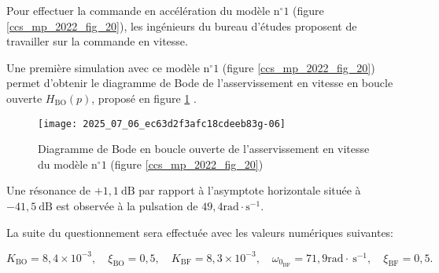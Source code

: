 Pour effectuer la commande en accélération du modèle $\mathrm{n}^{\circ} 1$ (figure \ref{ccs_mp_2022_fig_20}), les ingénieurs du bureau d'études proposent de travailler sur la commande en vitesse.


Une première simulation avec ce modèle $\mathrm{n}^{\circ} 1$ (figure \ref{ccs_mp_2022_fig_20}) permet d'obtenir le diagramme de Bode de l'asservissement en vitesse en boucle ouverte $H_{\mathrm{BO}}(p)$, proposé en figure \ref{ccs_mp_2022_fig_08} .

\begin{figure}[!h]
\centering
\texttt{[image: 2025\_07\_06\_ec63d2f3afc18cdeeb83g-06]}
\caption{\label{ccs_mp_2022_fig_08}Diagramme de Bode en boucle ouverte de l'asservissement en vitesse du modèle $\mathrm{n}^{\circ} 1$ (figure \ref{ccs_mp_2022_fig_20})}
\end{figure}



Une résonance de $+1,1 \mathrm{~dB}$ par rapport à l'asymptote horizontale située à $-41,5 \mathrm{~dB}$ est observée à la pulsation de $49,4 \mathrm{rad} \cdot \mathrm{s}^{-1}$.



La suite du questionnement sera effectuée avec les valeurs numériques suivantes:

$$
K_{\mathrm{BO}}=8,4 \times 10^{-3}, \quad \xi_{\mathrm{BO}}=0,5, \quad K_{\mathrm{BF}}=8,3 \times 10^{-3}, \quad \omega_{0_{\mathrm{BF}}}=71,9 \mathrm{rad} \cdot \mathrm{~s}^{-1}, \quad \xi_{\mathrm{BF}}=0,5 .
$$

